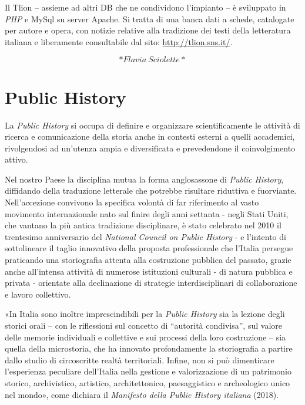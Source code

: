\documentclass[
  b5paper,
  twoside,
  12pt,
  chapterprefix=false,
  bibliography=totocnumbered,
  parskip=false]{scrbook}
\begin{document}
Il Tlion -- assieme ad altri DB che ne condividono l'impianto -- è
sviluppato in \emph{PHP} e MySql su server Apache. Si tratta di una banca
dati a schede, catalogate per autore e opera, con notizie relative alla
tradizione dei testi della letteratura italiana e liberamente
consultabile dal sito: \url{http://tlion.sns.it/}.

\[*Flavia~Sciolette*\]

\hypertarget{public-history}{%
\chapter{Public History}\label{public-history}}

La \emph{Public History} si occupa di definire e organizzare scientificamente
le attività di ricerca e comunicazione della storia anche in contesti
esterni a quelli accademici, rivolgendosi ad un'utenza ampia e
diversificata e prevedendone il coinvolgimento attivo.

Nel nostro Paese la disciplina mutua la forma anglosassone di \emph{Public
History}, diffidando della traduzione letterale che potrebbe risultare
riduttiva e fuorviante. Nell'accezione convivono la specifica volontà di
far riferimento al vasto movimento internazionale nato sul finire degli
anni settanta - negli Stati Uniti, che vantano la più antica tradizione
disciplinare, è stato celebrato nel 2010 il trentesimo anniversario del
\emph{National Council on Public History} - e l'intento di sottolineare il
taglio innovativo della proposta professionale che l'Italia persegue
praticando una storiografia attenta alla costruzione pubblica del
passato, grazie anche all'intensa attività di numerose istituzioni
culturali - di natura pubblica e privata - orientate alla declinazione
di strategie interdisciplinari di collaborazione e lavoro collettivo.

«In Italia sono inoltre imprescindibili per la \emph{Public History} sia la
lezione degli storici orali -- con le riflessioni sul concetto di
\enquote{autorità condivisa}, sul valore delle memorie individuali e collettive
e sui processi della loro costruzione -- sia quella della microstoria,
che ha innovato profondamente la storiografia a partire dallo studio di
circoscritte realtà territoriali. Infine, non si può dimenticare
l'esperienza peculiare dell'Italia nella gestione e valorizzazione di un
patrimonio storico, archivistico, artistico, architettonico,
paesaggistico e archeologico unico nel mondo», come dichiara il
\emph{Manifesto della Public History italiana} (2018).
\end{document}
